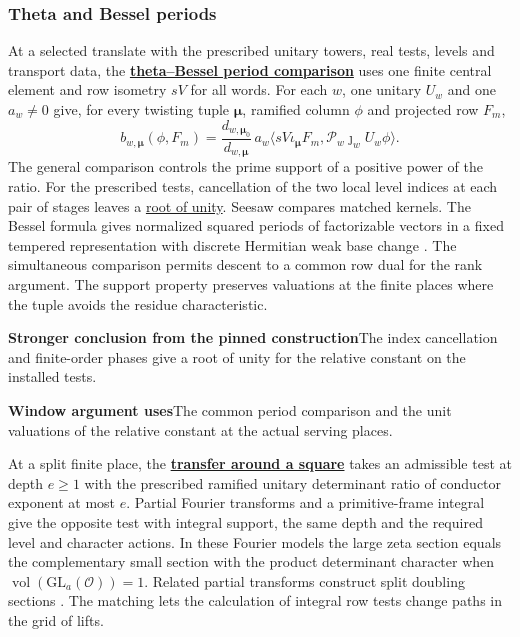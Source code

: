 \documentclass[11pt,a4paper]{article}
\newcommand{\rhscopelabel}[2]{%
  {\setlength{\fboxsep}{2pt}\colorbox{#1}{%
    \small\sffamily\bfseries\color{PageInk}#2}}}
\newcommand{\rhrange}[3][Stronger result in the original Lean release]{%
  \par\addvspace{.45\baselineskip}\Needspace{4\baselineskip}%
  \begingroup\setlength{\leftskip}{.65em}\setlength{\parindent}{0pt}%
  \noindent\rhscopelabel{TraceTint}{#1}\enspace#2\par
  \nobreak\smallskip
  \noindent\rhscopelabel{FieldTint}{Window argument uses}\enspace#3\par
  \endgroup\addvspace{.45\baselineskip}}
\begin{document}
\subsubsection*{Theta and Bessel periods}
At a selected translate with the prescribed unitary towers, real tests,
levels and transport data, the \textbf{\hyperlink{candidate.periods}{theta--Bessel period comparison}}
uses one finite central element and row isometry \(sV\) for all words.
For each \(w\), one unitary \(U_w\) and one \(a_w\ne0\) give, for every
twisting tuple \(\boldsymbol\mu\), ramified column \(\phi\) and projected row \(F_m\),
\[
 b_{w,\boldsymbol\mu}(\phi,F_m)
 =\frac{d_{w,\boldsymbol\mu_0}}{d_{w,\boldsymbol\mu}}\,
 a_w\big\langle sV\iota_{\boldsymbol\mu}F_m,
             \mathcal P_w\jmath_wU_w\phi\big\rangle .
\]
The general comparison controls the prime support of a positive power
of the ratio. For the prescribed tests, cancellation of the two local
level indices at each pair of stages leaves a
\hyperlink{proof.period-relative-phase}{root of unity}.
Seesaw compares matched kernels. The Bessel formula gives normalized
squared periods of factorizable vectors in a fixed tempered representation
with discrete Hermitian weak base change \cite{seesaw,p2bp-chaudouard-bessel}.
The simultaneous comparison permits descent to a common row dual for
the rank argument. The support property preserves valuations at the
finite places where the tuple avoids the residue characteristic.
\rhrange[Stronger conclusion from the pinned construction]{The index
cancellation and finite-order phases give a root of unity for the
relative constant on the installed tests.}
{The common period comparison and the unit valuations of the relative
constant at the actual serving places.}

At a split finite place, the \textbf{\hyperlink{candidate.transfer}{transfer around a square}}
takes an admissible test at depth \(e\ge1\) with the prescribed ramified
unitary determinant ratio of conductor exponent at most \(e\). Partial Fourier transforms and
a primitive-frame integral give the opposite test with integral support,
the same depth and the required level and character actions. In these
Fourier models the large zeta section
equals the complementary small section with the product determinant
character when \(\operatorname{vol}(\mathrm{GL}_a(\mathcal O))=1\).
Related partial transforms construct split doubling sections
\cite{p2eischen-doubling}. The matching lets the calculation of integral
row tests change paths in the grid of lifts.
\end{document}
